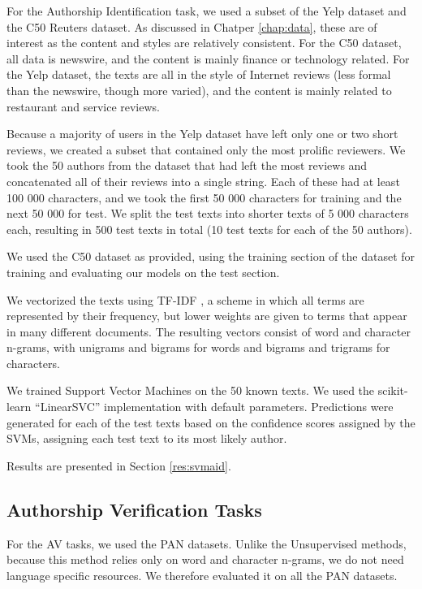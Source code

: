 For the Authorship Identification task, we used a subset of the Yelp dataset and the C50 Reuters dataset. As discussed in Chatper \ref{chap:data}, these are of interest as the content and styles are relatively consistent. For the C50 dataset, all data is newswire, and the content is mainly finance or technology related. For the Yelp dataset, the texts are all in the style of Internet reviews (less formal than the newswire, though more varied), and the content is mainly related to restaurant and service reviews.

Because a majority of users in the Yelp dataset have left only one or two short reviews, we created a subset that contained only the most prolific reviewers. We took the 50 authors from the dataset that had left the most reviews and concatenated all of their reviews into a single string. Each of these had at least 100 000 characters, and we took the first 50 000 characters for training and the next 50 000 for test. We split the test texts into shorter texts of 5 000 characters each, resulting in 500 test texts in total (10 test texts for each of the 50 authors).

We used the C50 dataset as provided, using the training section of the dataset for training and evaluating our models on the test section.

We vectorized the texts using TF-IDF \cite{robertson2004understanding}, a scheme in which all terms are represented by their frequency, but lower weights are given to terms that appear in many different documents. The resulting vectors consist of word and character n-grams, with unigrams and bigrams for words and bigrams and trigrams for characters.

We trained Support Vector Machines on the 50 known texts. We used the scikit-learn \cite{scikit-learn}  ``LinearSVC'' implementation with default parameters. Predictions were generated for each of the test texts based on the confidence scores assigned by the SVMs, assigning each test text to its most likely author.

Results are presented in Section \ref{res:svmaid}.

\subsection{Authorship Verification Tasks}

For the AV tasks, we used the PAN datasets. Unlike the Unsupervised methods, because this method relies only on word and character n-grams, we do not need language specific resources. We therefore evaluated it on all the PAN datasets.

